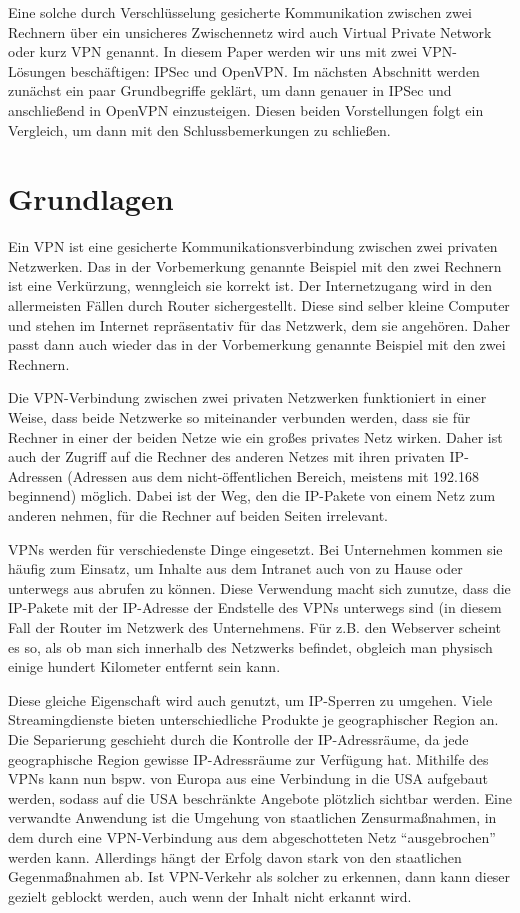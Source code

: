\documentclass[12pt]{scrartcl}
\begin{document}
Eine solche durch Verschlüsselung gesicherte Kommunikation zwischen zwei Rechnern über ein unsicheres Zwischennetz wird auch Virtual Private Network oder kurz VPN genannt. In diesem Paper werden wir uns mit zwei VPN-Lösungen beschäftigen: IPSec und OpenVPN. Im nächsten Abschnitt werden zunächst ein paar Grundbegriffe geklärt, um dann genauer in IPSec und anschließend in OpenVPN einzusteigen. Diesen beiden Vorstellungen folgt ein Vergleich, um dann mit den Schlussbemerkungen zu schließen.

\section{Grundlagen}
Ein VPN ist eine gesicherte Kommunikationsverbindung zwischen zwei privaten Netzwerken. Das in der Vorbemerkung genannte Beispiel mit den zwei Rechnern ist eine Verkürzung, wenngleich sie korrekt ist. Der Internetzugang wird in den allermeisten Fällen durch Router sichergestellt. Diese sind selber kleine Computer und stehen im Internet repräsentativ für das Netzwerk, dem sie angehören. Daher passt dann auch wieder das in der Vorbemerkung genannte Beispiel mit den zwei Rechnern. 

Die VPN-Verbindung zwischen zwei privaten Netzwerken funktioniert in einer Weise, dass beide Netzwerke so miteinander verbunden werden, dass sie für Rechner in einer der beiden Netze wie ein großes privates Netz wirken. Daher ist auch der Zugriff auf die Rechner des anderen Netzes mit ihren privaten IP-Adressen (Adressen aus dem nicht-öffentlichen Bereich, meistens mit 192.168 beginnend) möglich. Dabei ist der Weg, den die IP-Pakete von einem Netz zum anderen nehmen, für die Rechner auf beiden Seiten irrelevant.

VPNs werden für verschiedenste Dinge eingesetzt. Bei Unternehmen kommen sie häufig zum Einsatz, um Inhalte aus dem Intranet auch von zu Hause oder unterwegs aus abrufen zu können. Diese Verwendung macht sich zunutze, dass die IP-Pakete mit der IP-Adresse der Endstelle des VPNs unterwegs sind (in diesem Fall der Router im Netzwerk des Unternehmens. Für z.B. den Webserver scheint es so, als ob man sich innerhalb des Netzwerks befindet, obgleich man physisch einige hundert Kilometer entfernt sein kann.

Diese gleiche Eigenschaft wird auch genutzt, um IP-Sperren zu umgehen. Viele Streamingdienste bieten unterschiedliche Produkte je geographischer Region an. Die Separierung geschieht durch die Kontrolle der IP-Adressräume, da jede geographische Region gewisse IP-Adressräume zur Verfügung hat. Mithilfe des VPNs kann nun bspw. von Europa aus eine Verbindung in die USA aufgebaut werden, sodass auf die USA beschränkte Angebote plötzlich sichtbar werden. Eine verwandte Anwendung ist die Umgehung von staatlichen Zensurmaßnahmen, in dem durch eine VPN-Verbindung aus dem abgeschotteten Netz "`ausgebrochen"' werden kann. Allerdings hängt der Erfolg davon stark von den staatlichen Gegenmaßnahmen ab. Ist VPN-Verkehr als solcher zu erkennen, dann kann dieser gezielt geblockt werden, auch wenn der Inhalt nicht erkannt wird.
\end{document}
